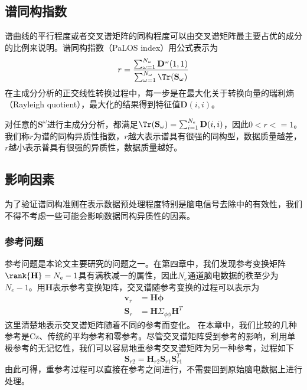 \subsection{谱同构指数}
谱曲线的平行程度或者交叉谱矩阵的同构程度可以由交叉谱矩阵最主要占优的成分的比例来说明。谱同构指数（PaLOS index）用公式表示为
\begin{equation}\label{eq5}
r=\frac{\sum_{\omega=1}^{N_\omega}\mathbf{D}^\omega(1,1)}{\sum_{\omega=1}^{N_\omega}\Tr(\mathbf{S}_\omega)}
\end{equation}
在主成分分析的正交线性转换过程中，每一步是在最大化关于转换向量的瑞利熵（Rayleigh quotient），最大化的结果得到特征值$\mathbf{D}(i,i)$。

对任意的$\mathbf{S}^\omega$进行主成分分析，都满足$\Tr(\mathbf{S}_\omega)=\sum_{i=1}^{N_e}\mathbf{D}(i,i)$，因此$0<r<=1$。 我们称$r$为谱的同构异质性指数，$r$越大表示谱具有很强的同构型，数据质量越差，$r$越小表示普具有很强的异质性，数据质量越好。

\subsection{影响因素}
为了验证谱同构准则在表示数据预处理程度特别是脑电信号去除中的有效性，我们不得不考虑一些可能会影响数据同构异质性的因素。
\subsubsection{参考问题}
参考问题是本论文主要研究的问题之一。在第四章中，我们发现参考变换矩阵$\rank{\mathbf{H}}=N_e-1$具有满秩减一的属性，因此$N_e$通道脑电数据的秩至少为$N_e-1$。用$\mathbf{H}$表示参考变换矩阵，交叉谱随参考变换的过程可以表示为
\begin{equation}\label{eq6}
\begin{split}
\mathbf{v}_r& =\mathbf{H\phi}\\
\mathbf{S}_r& =\mathbf{H}\Sigma_{\phi\phi}\mathbf{H}^T
\end{split}
\end{equation}
这里清楚地表示交叉谱矩阵随着不同的参考而变化。 在本章中，我们比较的几种参考是Cz、传统的平均参考和零参考。尽管交叉谱矩阵受到参考的影响，利用单极参考的无记忆性，我们可以容易地重参考交叉谱矩阵为另一种参考，过程如下
\begin{equation}\label{eq7}
\mathbf{S}_{r2}=\mathbf{H}_{r2}\mathbf{S}_{r1}\mathbf{S}_{r1}^T
\end{equation}
由此可得，重参考过程可以直接在参考之间进行，不需要回到原始脑电数据上进行处理。

